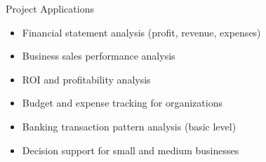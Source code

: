 
\begin{frame}{Project Applications}
    \begin{itemize}
        \item Financial statement analysis (profit, revenue, expenses)
        \item Business sales performance analysis
        \item ROI and profitability analysis
        \item Budget and expense tracking for organizations
        \item Banking transaction pattern analysis (basic level)
        \item Decision support for small and medium businesses
    \end{itemize}
\end{frame}
